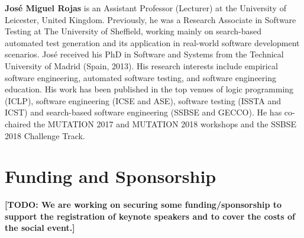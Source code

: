 \documentclass[10pt,conference]{IEEEtran}
\newcommand{\TODO}[1]{\textbf{\textcolor{ScarletRed}{[TODO: #1]}}\xspace}
\newcommand{\TODO}[1]{}
\begin{document}
{\bf Jos\'e Miguel Rojas} is an Assistant Professor (Lecturer) at the
University of Leicester, United Kingdom. Previously, he was a Research
Associate in Software Testing at The University of Sheffield, working
mainly on search-based automated test generation and its application
in real-world software development scenarios. Jos\'e received his PhD
in Software and Systems from the Technical University of Madrid
(Spain, 2013). His research interests include empirical software
engineering, automated software testing, and software engineering
education. His work has been published in the top venues of logic
programming (ICLP), software engineering (ICSE and ASE), software
testing (ISSTA and ICST) and search-based software engineering (SSBSE
and GECCO). He has co-chaired the MUTATION 2017 and MUTATION 2018
workshops and the SSBSE 2018 Challenge Track.


\section{Funding and Sponsorship}

\TODO{We are working on securing some funding/sponsorship to support
  the registration of keynote speakers and to cover the costs of the
  social event.}




\end{document}
